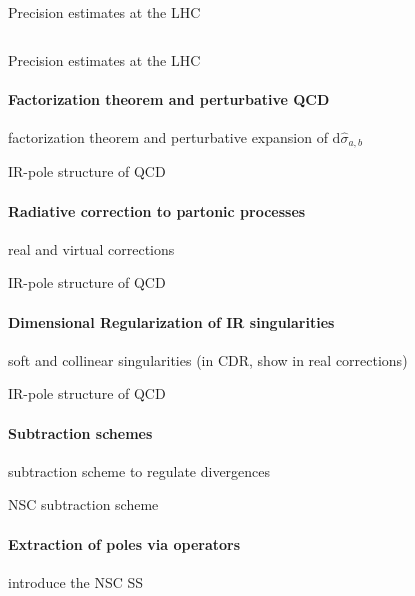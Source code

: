 \begin{frame}{Precision estimates at the LHC}
\begin{columns}
\begin{column}{0.5\textwidth}
    \end{column}

  \end{columns}

\end{frame}


\begin{frame}{Precision estimates at the LHC}
  \framesubtitle{Factorization theorem and perturbative QCD}

  factorization theorem and perturbative expansion of $ \mathrm{d} \hat{\sigma}_{a,b} $

\end{frame}


\begin{frame}{IR-pole structure of QCD}
  \framesubtitle{Radiative correction to partonic processes}

  real and virtual corrections

\end{frame}


\begin{frame}{IR-pole structure of QCD}
  \framesubtitle{Dimensional Regularization of IR singularities}

  soft and collinear singularities (in CDR, show in real corrections)

\end{frame}


\begin{frame}{IR-pole structure of QCD}
  \framesubtitle{Subtraction schemes}

  subtraction scheme to regulate divergences

\end{frame}


\begin{frame}{NSC subtraction scheme}
  \framesubtitle{Extraction of poles via operators}

  introduce the NSC SS

\end{frame}

